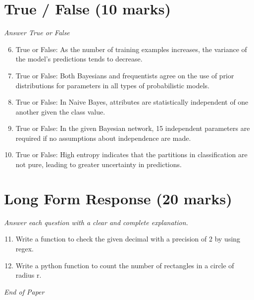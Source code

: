 \documentclass[12pt]{article}
\begin{document}
\section*{True / False (10 marks)}
\textit{Answer True or False}
\begin{enumerate}[label=\arabic*.]
\setcounter{enumi}{5}
\item True or False: As the number of training examples increases, the variance of the model's predictions tends to decrease.
\item True or False: Both Bayesians and frequentists agree on the use of prior distributions for parameters in all types of probabilistic models.
\item True or False: In Naive Bayes, attributes are statistically independent of one another given the class value.
\item True or False: In the given Bayesian network, 15 independent parameters are required if no assumptions about independence are made.
\item True or False: High entropy indicates that the partitions in classification are not pure, leading to greater uncertainty in predictions.
\end{enumerate}

\section*{Long Form Response (20 marks)}
\textit{Answer each question with a clear and complete explanation.}
\begin{enumerate}[label=\arabic*.]
\setcounter{enumi}{10}
\item Write a function to check the given decimal with a precision of 2 by using regex.
\item Write a python function to count the number of rectangles in a circle of radius r.
\end{enumerate}

\vfill
\noindent\textit{End of Paper}
\end{document}
